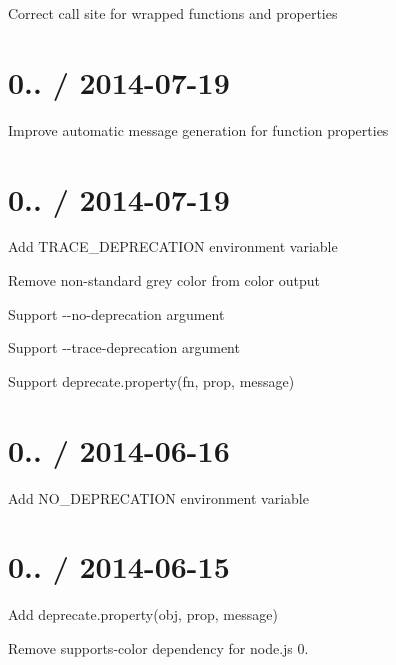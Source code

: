\begin{DoxyItemize}
\item Correct call site for wrapped functions and properties
\end{DoxyItemize}

\section*{0.. / 2014-\/07-\/19 }


\begin{DoxyItemize}
\item Improve automatic message generation for function properties
\end{DoxyItemize}

\section*{0.. / 2014-\/07-\/19 }


\begin{DoxyItemize}
\item Add {\ttfamily T\+R\+A\+C\+E\+\_\+\+D\+E\+P\+R\+E\+C\+A\+T\+I\+O\+N} environment variable
\item Remove non-\/standard grey color from color output
\item Support {\ttfamily -\/-\/no-\/deprecation} argument
\item Support {\ttfamily -\/-\/trace-\/deprecation} argument
\item Support {\ttfamily deprecate.\+property(fn, prop, message)}
\end{DoxyItemize}

\section*{0.. / 2014-\/06-\/16 }


\begin{DoxyItemize}
\item Add {\ttfamily N\+O\+\_\+\+D\+E\+P\+R\+E\+C\+A\+T\+I\+O\+N} environment variable
\end{DoxyItemize}

\section*{0.. / 2014-\/06-\/15 }


\begin{DoxyItemize}
\item Add {\ttfamily deprecate.\+property(obj, prop, message)}
\item Remove {\ttfamily supports-\/color} dependency for node.\+js 0.
\end{DoxyItemize}

